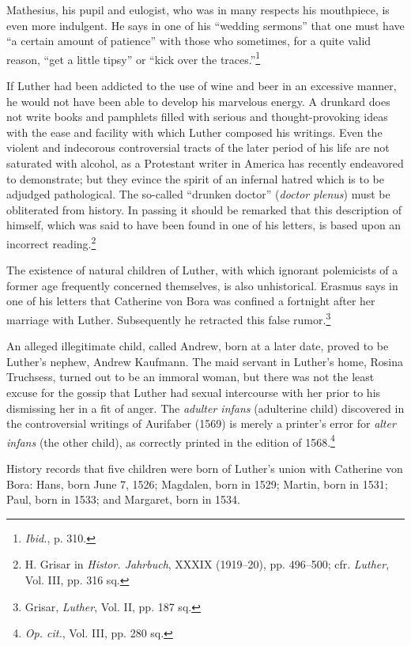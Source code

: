 Mathesius, his pupil and eulogist, who was in many respects his
mouthpiece, is even more indulgent. He says in one of his ``wedding
sermons'' that one must have “a certain amount of patience” with
those who sometimes, for a quite valid reason, “get a little tipsy”
or “kick over the traces.”\footnote{\textit{Ibid.}, p. 310.}

If Luther had been addicted to the use of wine and beer in an
excessive manner, he would not have been able to develop his marvelous
energy. A drunkard does not write books and pamphlets filled
with serious and thought-provoking ideas with the ease and facility with
which Luther composed his writings. Even the violent and indecorous
controversial tracts of the later period of his life are not saturated
with alcohol, as a Protestant writer in America has recently endeavored
to demonstrate; but they evince the spirit of an infernal hatred
which is to be adjudged pathological. The so-called “drunken doctor”
(\textit{doctor plenus}) must be obliterated from history. In passing
it should be remarked that this description of himself, which was
said to have been found in one of his letters, is based upon an incorrect
reading.\footnote{H. Grisar in \textit{Histor. Jahrbuch}, XXXIX (1919--20), pp. 496--500; cfr. \textit{Luther}, Vol. III,
pp. 316 sq.}

The existence of natural children of Luther, with which ignorant polemicists of
a former age frequently concerned themselves, is also unhistorical. Erasmus
says in one of his letters that Catherine von Bora was confined a fortnight
after her marriage with Luther. Subsequently he retracted this false
rumor.\footnote{Grisar, \textit{Luther}, Vol. II, pp. 187 sq.}

An alleged illegitimate child, called Andrew, born at a later date, proved to
be Luther’s nephew, Andrew Kaufmann. The maid servant in Luther’s home, Rosina
Truchsess, turned out to be an immoral woman, but there was not the least
excuse for the gossip that Luther had sexual intercourse with her prior to his
dismissing her in a fit of anger. The \textit{adulter infans} (adulterine child)
discovered in the controversial writings of Aurifaber (1569) is merely a
printer’s error for \textit{alter infans} (the other child), as correctly printed in the
edition of 1568.\footnote{\textit{Op. cit.}, Vol. III, pp. 280 sq.}

History records that five children were born of Luther’s union with
Catherine von Bora: Hans, born June 7, 1526; Magdalen, born in
1529; Martin, born in 1531; Paul, born in 1533; and Margaret,
born in 1534.

